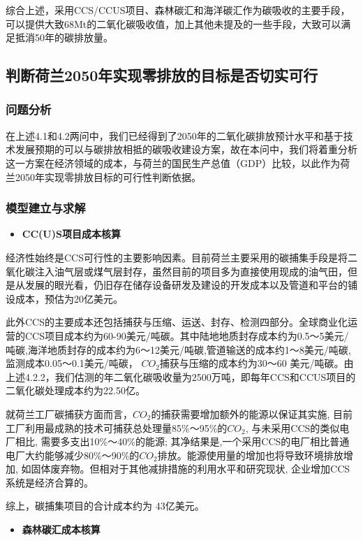 \documentclass[bwprint]{gmcmthesis}
\numberwithin{figure}{section}
\newcommand{\upcite}[1]{\textsuperscript{\textsuperscript{\cite{#1}}}}
\begin{document}
综合上述，采用CCS/CCUS项目、森林碳汇和海洋碳汇作为碳吸收的主要手段，可以提供大致68Mt的二氧化碳吸收值，加上其他未提及的一些手段，大致可以满足抵消50年的碳排放量。
\subsection{判断荷兰2050年实现零排放的目标是否切实可行}
\subsubsection{问题分析}
在上述4.1和4.2两问中，我们已经得到了2050年的二氧化碳排放预计水平和基于技术发展预期的可以与碳排放相抵的碳吸收建设方案，故在本问中，我们将着重分析这一方案在经济领域的成本，与荷兰的国民生产总值（GDP）比较，以此作为荷兰2050年实现零排放目标的可行性判断依据。
\subsubsection{模型建立与求解}
\begin{itemize}
	\item \textbf{CC(U)S项目成本核算}
\end{itemize}

经济性始终是CCS可行性的主要影响因素。目前荷兰主要采用的碳捕集手段是将二氧化碳注入油气层或煤气层封存，虽然目前的项目多为直接使用现成的油气田，但是从发展的眼光看，仍旧存在储存设备研发及建设的开发成本以及管道和平台的铺设成本，预估为20亿美元。

此外CCS的主要成本还包括捕获与压缩、运送、封存、检测四部分。\upcite{3-1}全球商业化运营的CCS项目成本约为60-90美元/吨碳。其中陆地地质封存成本约为0.5～5美元/吨碳,海洋地质封存的成本约为6～12美元/吨碳,管道输送的成本约1～8美元/吨碳,监测成本0.05～0.1美元/吨碳， $CO_2$捕获与压缩的成本约为30～60 美元/吨碳。\upcite{3-2}由上述4.2.2，我们估测的年二氧化碳吸收量为2500万吨，即每年CCS和CCUS项目的二氧化碳处理成本约为22.50亿。

就荷兰工厂碳捕获方面而言，$CO_2$的捕获需要增加额外的能源以保证其实施, 目前工厂利用最成熟的技术可捕获总处理量85\%～95\%的$CO_2$, 与未采用CCS的类似电厂相比, 需要多支出10\%～40\%的能源; 其净结果是,一个采用CCS的电厂相比普通电厂大约能够减少80\%～90\%的$CO_2$排放。能源使用量的增加也将导致环境排放增加, 如固体废弃物。但相对于其他减排措施的利用水平和研究现状, 企业增加CCS系统是经济合算的。

综上，碳捕集项目的合计成本约为 43亿美元。

\begin{itemize}
	\item \textbf{森林碳汇成本核算}
\end{itemize}
\end{document}
